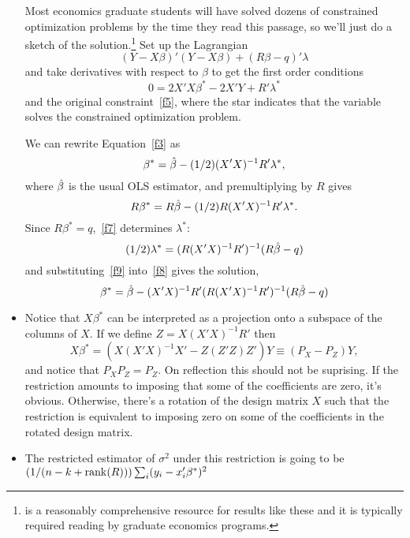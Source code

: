 \begin{itemize}
  Most economics graduate students will have solved dozens of
  constrained optimization problems by the time they read this
  passage, so we'll just do a sketch of the
  solution.\footnote{\citet{SB94} is a reasonably comprehensive
    resource for results like these and it is typically required
    reading by graduate economics programs.}  Set up the Lagrangian
  \begin{equation}\label{f6}
    (Y - X\beta)'(Y - X\beta) + (R\beta - q)' \lambda
  \end{equation}
  and take derivatives with respect to $\beta$ to get the first order
  conditions
  \begin{equation}\label{f3}
    0 = 2X'X \beta^* - 2 X'Y + R'\lambda^*
  \end{equation}
  and the original constraint~\eqref{f5}, where the star indicates
  that the variable solves the constrained optimization problem.
  
  We can rewrite Equation~\eqref{f3} as
  \begin{equation}\label{f8}
    \beta^* = \betah - (1/2) (X'X)^{-1} R'\lambda^*,
  \end{equation}
  where $\hat{\beta}$ is the usual OLS estimator, and premultiplying by $R$
  gives
  \begin{equation}\label{f7}
    R\beta^* = R \betah - (1/2) R (X'X)^{-1} R'\lambda^*.
  \end{equation}
  Since $R\beta^* = q$,~\eqref{f7} determines $\lambda^*$:
  \begin{equation}\label{f9}
    (1/2) \lambda^* = (R (X'X)^{-1} R')^{-1} (R \betah - q)
  \end{equation}
  and substituting~\eqref{f9} into~\eqref{f8} gives the solution,
  \begin{equation}\label{f10}
    \beta^* = \betah - (X'X)^{-1} R' (R (X'X)^{-1} R')^{-1} (R \betah - q)
  \end{equation}

\item Notice that $X\beta^*$ can be interpreted as a projection onto a
  subspace of the columns of $X$.  If we define $Z = X (X'X)^{-1} R'$
  then
  \begin{equation*}
    X \beta^* = (X(X'X)^{-1}X' - Z(Z'Z)Z') Y \equiv (P_X - P_Z) Y,
  \end{equation*}
  and notice that $P_X P_Z = P_Z$.  On reflection this should not be
  suprising.  If the restriction amounts to imposing that some of the
  coefficients are zero, it's obvious.  Otherwise, there's a rotation
  of the design matrix $X$ such that the restriction is equivalent to
  imposing zero on some of the coefficients in the rotated design
  matrix.

\item The restricted estimator of $\sigma^2$ under this restriction is going
  to be $(1/(n - k + \operatorname{rank}(R))) \sum_i (y_i - x_i'\beta^*)^2$

\end{itemize}


